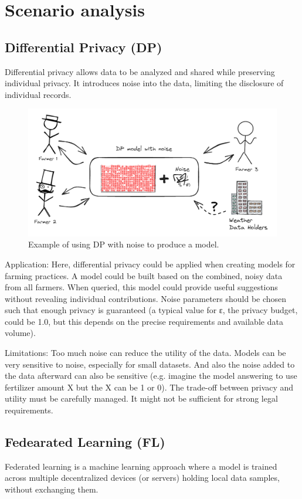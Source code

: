 \section{Scenario analysis}

\subsection{Differential Privacy (DP)}
Differential privacy allows data to be analyzed and shared while preserving individual privacy.
It introduces noise into the data, limiting the disclosure of individual records.


\begin{figure}[!htbp]
  \centering
  \includegraphics[width=\textwidth]{assets/img_3}
  \caption{Example of using DP with noise to produce a model.}
  \label{fig:img_3}
\end{figure}

Application: Here, differential privacy could be applied when creating models for farming practices.
A model could be built based on the combined, noisy data from all farmers.
When queried, this model could provide useful suggestions without revealing individual contributions.
Noise parameters should be chosen such that enough privacy is guaranteed
(a typical value for ε, the privacy budget, could be 1.0, but this depends on the precise requirements and available data volume).

Limitations: Too much noise can reduce the utility of the data.
Models can be very sensitive to noise, especially for small datasets.
And also the noise added to the data afterward can also be sensitive (e.g. imagine the model answering to use fertilizer amount X but the
X can be 1 or 0).
The trade-off between privacy and utility must be carefully managed.
It might not be sufficient for strong legal requirements.

\subsection{Fedearated Learning (FL)}
Federated learning is a machine learning approach where a model is trained across multiple decentralized devices
(or servers) holding local data samples, without exchanging them.

